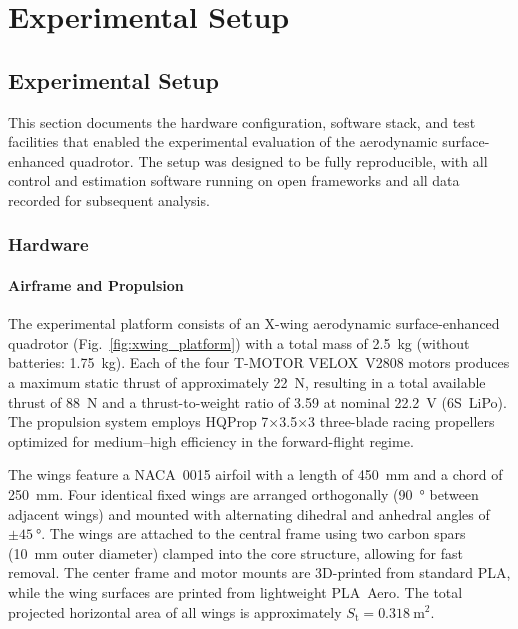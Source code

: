 
\chapter{Experimental Setup}\label{chapter:experimental-setup}

\section{Experimental Setup}
\label{sec:experimental_setup}

This section documents the hardware configuration, software stack, and test facilities that enabled the experimental evaluation of the aerodynamic surface-enhanced quadrotor. The setup was designed to be fully reproducible, with all control and estimation software running on open frameworks and all data recorded for subsequent analysis.

\subsection{Hardware}

\subsubsection{Airframe and Propulsion}
The experimental platform consists of an X-wing aerodynamic surface-enhanced quadrotor (Fig.~\ref{fig:xwing_platform}) with a total mass of \SI{2.5}{\kilogram} (without batteries: \SI{1.75}{\kilogram}). Each of the four T-MOTOR VELOX~V2808 motors produces a maximum static thrust of approximately \SI{22}{\newton}, resulting in a total available thrust of \SI{88}{\newton} and a thrust-to-weight ratio of 3.59 at nominal \SI{22.2}{\volt} (6S~LiPo). The propulsion system employs HQProp 7×3.5×3 three-blade racing propellers optimized for medium–high efficiency in the forward-flight regime.

The wings feature a NACA~0015 airfoil with a length of \SI{450}{\milli\meter} and a chord of \SI{250}{\milli\meter}. Four identical fixed wings are arranged orthogonally (\SI{90}{\degree} between adjacent wings) and mounted with alternating dihedral and anhedral angles of $\pm\SI{45}{\degree}$. The wings are attached to the central frame using two carbon spars (\SI{10}{\milli\meter} outer diameter) clamped into the core structure, allowing for fast removal. The center frame and motor mounts are 3D-printed from standard PLA, while the wing surfaces are printed from lightweight PLA~Aero. The total projected horizontal area of all wings is approximately $S_\mathrm{t} = 0.318~\si{\meter\squared}$.

